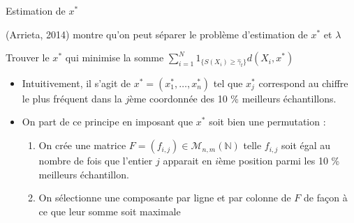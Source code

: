 \documentclass[10pt,xcolor=table,color={dvipsnames,usenames},ignorenonframetext,usepdftitle=false,french]{beamer}
\begin{document}
\begin{frame}{Estimation de \(x^*\)}
\protect\hypertarget{estimation-de-x}{}

\bcloupe (Arrieta, 2014) montre qu'on peut séparer le problème
d'estimation de \(x^*\) et \(\lambda\)

\pause

Trouver le \(x^*\) qui minimise la somme
\(\sum_{i=1}^N 1_{\{S(X_{i})\geq\hat{\gamma}_{t}\}}d(X_i,x^*)\)

\begin{itemize}

\pause 

\item Intuitivement, il s'agit de $x^*=(x_1^*,\dots,x_n^*)$ tel que $x_j^*$ correspond au chiffre le plus fréquent dans la $j$ème coordonnée des 10 \% meilleurs échantillons.

\pause 

\item On part de ce principe en imposant que $x^*$ soit bien une permutation :

\begin{enumerate}
\item On crée une matrice $F=(f_{i,j})\in\mathcal M_{n,m}(\mathbb{N})$ telle $f_{i,j}$ soit égal au nombre de fois que l'entier $j$ apparait en $i$ème position parmi les 10 \% meilleurs échantillon.

\item On sélectionne une composante par ligne et par colonne de $F$ de façon à ce que leur somme soit maximale
\end{enumerate}
\end{itemize}

\end{frame}
\end{document}
